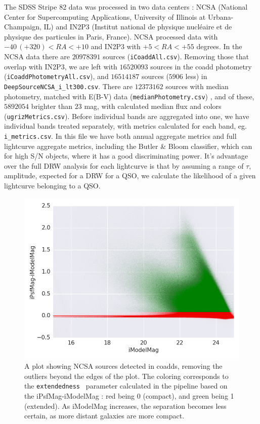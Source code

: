 \documentclass[fleqn,usenatbib]{mnras}  %
\begin{document}
The SDSS Stripe 82 data was processed in two data centers : NCSA (National Center for Supercomputing Applications, University of Illinois at Urbana-Champaign, IL) and IN2P3  (Institut national de physique nucl\'eaire et de physique des particules in Paris, France). NCSA processed data  with  $-40 \, (+320) < RA < +10 $ and IN2P3 with $ +5 < RA < +55$ degrees. In the NCSA data  there are $20978391$ sources (\verb|iCoaddAll.csv|). Removing those that overlap with IN2P3, we are left with  $16520093$ sources in the coadd photometry (\verb|iCoaddPhotometryAll.csv|), and $16514187$ sources ($5906$ less) in \verb|DeepSourceNCSA_i_lt300.csv|. There are $12373162$ sources with median photometry, matched with E(B-V) data (\verb|medianPhotometry.csv|) , and  of these, $5892054$ brighter than $23$ mag, with calculated median flux and colors (\verb|ugrizMetrics.csv|). Before individual bands are aggregated into one, we have individual bands treated separately, with metrics calculated for each band, eg. \verb|i_metrics.csv|. In this file we have both annual aggregate metrics and full lightcurve aggregate metrics, including the Butler \& Bloom classifier, which can  for high S/N objects, where it has a good discriminating power. It's advantage over the full DRW analysis for each lightcurve is that by assuming a range of $\tau$, amplitude, expected for a DRW for a QSO, we calculate the likelihood of a given lightcurve belonging to a QSO. 


\begin{figure}
\label{fig:coadds_ext}
 \includegraphics[width=\columnwidth]{Extendedness_coadd_data_16520093_srcs_lim.png}
 \cprotect\caption{A plot showing NCSA sources detected in coadds, removing the outliers beyond the edges of the plot. The coloring corresponds to the \verb|extendedness | parameter calculated in the pipeline based on the iPsfMag-iModelMag : red being 0 (compact), and green being 1 (extended). As iModelMag increases, the separation becomes less certain, as more distant galaxies are more compact.  }
\end{figure}
% 
\end{document}
